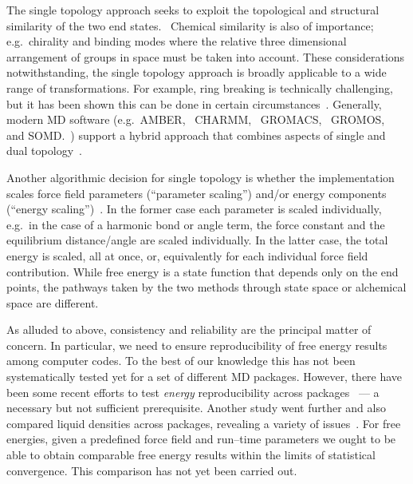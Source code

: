 \documentclass[journal=jctcce,manuscript=article]{achemso}
\begin{document}
The single topology approach seeks to exploit the
topological and structural similarity of the two end states.~\cite{doi:10.1021/j100056a020}
Chemical similarity is also of
importance; e.g.\ chirality and binding modes where the relative three
dimensional arrangement of groups in space must be taken into account.
These considerations notwithstanding, the single topology approach is broadly applicable to a wide range of transformations.
For example, ring breaking is technically
challenging,~\cite{doi:10.1021/acs.jctc.6b00991} but it has been
shown this can be done in certain
circumstances~\cite{doi:10.1021/acs.jcim.5b00057,
  doi:10.1021/jp994193s}.
Generally, modern MD software (e.g.\ AMBER,~\cite{case_amber_2005}
CHARMM,~\cite{JCC:JCC21287} GROMACS,~\cite{Abraham201519}
GROMOS,~\cite{doi:10.1021/jp984217f} and SOMD.~\cite{Sire-2016,
  doi:10.1021/ct300857j}) support a hybrid approach that combines aspects of single and dual topology~\cite{doi:10.1021/jp994193s}.

Another algorithmic decision for single topology is whether  the implementation scales force field parameters (``parameter
scaling'') and/or energy components (``energy
scaling'')~\cite{doi:10.1021/jp981628n}.  In the former case each parameter is
scaled individually, e.g.\ in the case of a harmonic bond or angle term,
the force constant and the equilibrium distance/angle are scaled
individually.  In the
latter case, the total energy is scaled, all at once, or, equivalently for each
individual force field contribution.  While free energy is a state function that
depends only on the end points, the pathways taken by the
two methods through state space or alchemical space are different.


As alluded to above, consistency and reliability are the principal matter of concern.
In particular, we need to ensure reproducibility of free energy results
among computer codes.  To the best of our knowledge this has not been
systematically tested yet for a set of different MD packages.
However, there have been some recent efforts to test \emph{energy}
reproducibility across packages~\cite{Shirts2017} --- a necessary but not
sufficient prerequisite.  Another study went further and also compared liquid
densities across packages, revealing a variety of
issues~\cite{doi:10.1021/acs.jctc.7b00489}.
For free energies, given a predefined force field and run--time
parameters we ought to be able to obtain comparable free energy
results within the limits of statistical convergence.  This comparison
has not yet been carried out.
\end{document}
